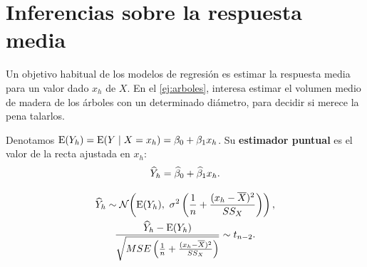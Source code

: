 \section{Inferencias sobre la respuesta media}
\label{sec:t3-respuesta-media}

Un objetivo habitual de los modelos de regresión es estimar la respuesta media para un valor
dado $x_h$ de $X$. En el \cref{ej:arboles}, interesa estimar el volumen medio de madera de los
árboles con un determinado diámetro, para decidir si merece la pena talarlos.

Denotamos $\operatorname{E}(Y_h)=\operatorname{E}(Y\mid X=x_h)=\beta_0+\beta_1x_h$. Su \textbf{estimador puntual} es el
valor de la recta ajustada en $x_h$:
\[
  \widehat{Y}_h = \widehat{\beta}_0 + \widehat{\beta}_1x_h .
\]

\begin{teorema}
  \begin{gather*}
    \est{Y}_h \sim \Normal\!\left(\E(Y_h),\ \sigma^2\left(\frac1n+\frac{(x_h-\media{X})^2}{\SSX}\right)\right),
    \\
    \frac{\est{Y}_h-\E(Y_h)}{\raizMSE{\frac1n+\frac{(x_h-\media{X})^2}{\SSX}}} \sim \tdist{n-2}.
  \end{gather*}
\end{teorema}

